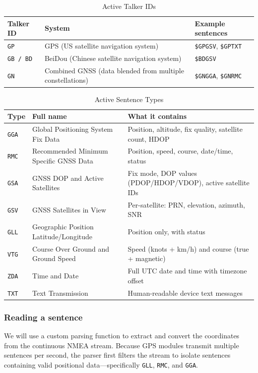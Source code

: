 \begin{table}[h!]
\centering
\label{tab:talker_ids}
\begin{tabularx}{\textwidth}{|l|X|X|}
\hline
\textbf{Talker ID} & \textbf{System} & \textbf{Example sentences} \\ \hline
\texttt{GP} & GPS (US satellite navigation system) & \texttt{\$GPGSV}, \texttt{\$GPTXT} \\ \hline
\texttt{GB / BD} & BeiDou (Chinese satellite navigation system) & \texttt{\$BDGSV} \\ \hline
\texttt{GN} & Combined GNSS (data blended from multiple constellations) & \texttt{\$GNGGA}, \texttt{\$GNRMC} \\ \hline
\end{tabularx}
\caption{Active Talker IDs}
\end{table}

\begin{table}[h!]
\centering
\label{tab:sentence_types}
\begin{tabularx}{\textwidth}{|l|X|X|}
\hline
\textbf{Type} & \textbf{Full name} & \textbf{What it contains} \\ \hline
\texttt{GGA} & Global Positioning System Fix Data & Position, altitude, fix quality, satellite count, HDOP \\ \hline
\texttt{RMC} & Recommended Minimum Specific GNSS Data & Position, speed, course, date/time, status \\ \hline
\texttt{GSA} & GNSS DOP and Active Satellites & Fix mode, DOP values (PDOP/HDOP/VDOP), active satellite IDs \\ \hline
\texttt{GSV} & GNSS Satellites in View & Per-satellite: PRN, elevation, azimuth, SNR \\ \hline
\texttt{GLL} & Geographic Position Latitude/Longitude & Position only, with status \\ \hline
\texttt{VTG} & Course Over Ground and Ground Speed & Speed (knots + km/h) and course (true + magnetic) \\ \hline
\texttt{ZDA} & Time and Date & Full UTC date and time with timezone offset \\ \hline
\texttt{TXT} & Text Transmission & Human-readable device text messages \\ \hline
\end{tabularx}
\caption{Active Sentence Types}
\end{table}

\newpage
\subsubsection{Reading a sentence}
We will use a custom parsing function to extract and convert the coordinates from the continuous NMEA stream. Because GPS modules transmit multiple sentences per second, the parser first filters the stream to isolate sentences containing valid positional data—specifically \texttt{GLL}, \texttt{RMC}, and \texttt{GGA}. 

